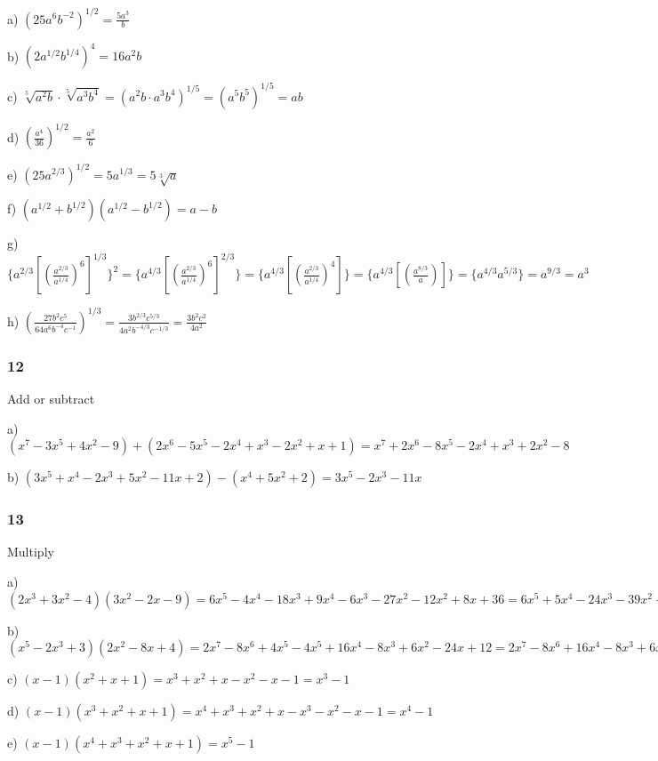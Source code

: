 \documentclass[]{report}
\begin{document}
a) $(25a^6b^{-2})^{1/2} = \frac{5a^3}{b}$


b) $(2a^{1/2}b^{1/4})^4 = 16a^2b$

c) $\sqrt[5]{a^2b} \cdot \sqrt[5]{a^3b^4} = (a^2b \cdot a^3b^4)^{1/5} = (a^5b^5)^{1/5} = ab$

d) $(\frac{a^4}{36})^{1/2} = \frac{a^2}{6}$

e) $(25a^{2/3})^{1/2} = 5a^{1/3} = 5\sqrt[3]{a}$

f) $(a^{1/2} + b^{1/2})(a^{1/2} - b^{1/2}) = a - b$

g) $\{a^{2/3} [(\frac{a^{2/3}}{a^{1/4}})^6]^{1/3}\}^2 = \{a^{4/3} [(\frac{a^{2/3}}{a^{1/4}})^6]^{2/3}\} = \{a^{4/3} [(\frac{a^{2/3}}{a^{1/4}})^4]\} = \{a^{4/3} [(\frac{a^{8/3}}{a})]\} =  \{a^{4/3} a^{5/3}\} = a^{9/3} = a^3$

h) $(\frac{27b^2c^5}{64a^6b^{-4}c^{-1}})^{1/3} =  \frac{3b^{2/3}c^{5/3}}{4a^2b^{-4/3}c^{-1/3}} = \frac{3b^2c^2}{4a^2}$



\subsubsection{12}

Add or subtract


a) $(x^7 - 3x^5 + 4x^2 - 9) + (2x^6 - 5x^5 - 2x^4 + x^3 - 2x^2 + x + 1) = x^7 + 2x^6 - 8x^5 - 2x^4 + x^3 + 2x^2 - 8$

b) $(3x^5 + x^4 - 2x^3 + 5x^2 - 11x + 2) - (x^4 + 5x^2 + 2) = 3x^5 - 2x^3 - 11x$


\subsubsection{13}
Multiply

a) $(2x^3 + 3x^2 - 4)(3x^2 - 2x - 9) = 6x^5 - 4x^4 - 18x^3 + 9x^4 - 6x^3 - 27x^2 - 12x^2 + 8x + 36 = 6x^5 + 5x^4 - 24x^3 - 39x^2 + 8x + 36$

b) $(x^5 - 2x^3 + 3)(2x^2 - 8x + 4) = 2x^7 - 8x^6 + 4x^5 - 4x^5 + 16x^4 - 8x^3 + 6x^2 - 24x + 12 =  2x^7 - 8x^6 + 16x^4 - 8x^3 + 6x^2 - 24x + 12$

c) $(x-1)(x^2 + x + 1) = x^3 + x^2 + x - x^2 - x - 1 = x^3 - 1$

d) $(x-1)(x^3 + x^2 + x + 1) = x^4 + x^3 + x^2 + x - x^3 - x^2 - x - 1 = x^4 -1$

e) $(x-1)(x^4+x^3+x^2+x+1) = x^5 - 1$
\end{document}
